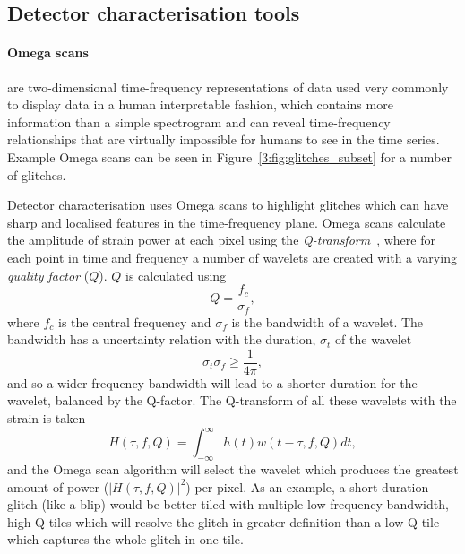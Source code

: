 \subsection{\label{3:sec:detchar-tools}Detector characterisation tools}

\paragraph{Omega scans}

are two-dimensional time-frequency representations of \gwadj data used very commonly to display \gwadj data in a human interpretable fashion, which contains more information than a simple spectrogram and can reveal time-frequency relationships that are virtually impossible for humans to see in the time series. Example Omega scans can be seen in Figure~\ref{3:fig:glitches_subset} for a number of glitches.

Detector characterisation uses Omega scans to highlight glitches which can have sharp and localised features in the time-frequency plane. Omega scans calculate the amplitude of strain power at each pixel using the \textit{Q-transform}~\cite{qscan:2004}, where for each point in time and frequency a number of wavelets are created with a varying \textit{quality factor} ($Q$). $Q$ is calculated using
%
\begin{equation}
    Q = \frac{f_{c}}{\sigma_{f}},
\end{equation}
%
where $f_{c}$ is the central frequency and $\sigma_{f}$ is the bandwidth of a wavelet. The bandwidth has a uncertainty relation with the duration, $\sigma_{t}$ of the wavelet
%
\begin{equation}
    \sigma_{t} \sigma_{f} \ge \frac{1}{4\pi},
\end{equation}
%
and so a wider frequency bandwidth will lead to a shorter duration for the wavelet, balanced by the Q-factor. The Q-transform of all these wavelets with the \gwadj strain is taken
%
\begin{equation}
    H(\tau, f, Q) = \int^{\infty}_{-\infty} h(t) w(t - \tau, f, Q) dt,
\end{equation}
%
and the Omega scan algorithm will select the wavelet which produces the greatest amount of power ($|H(\tau, f, Q)|^{2}$) per pixel. As an example, a short-duration glitch (like a blip) would be better tiled with multiple low-frequency bandwidth, high-Q tiles which will resolve the glitch in greater definition than a low-Q tile which captures the whole glitch in one tile.

